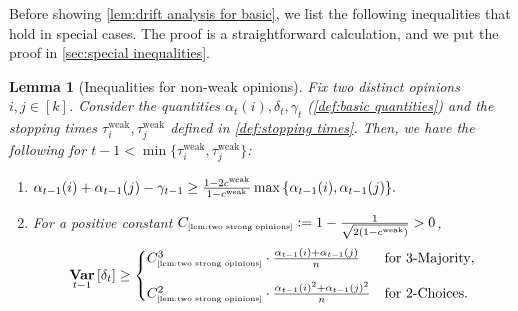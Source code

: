 \documentclass[letterpaper,11pt]{article}
\newtheorem{lemma}[theorem]{Lemma}
\def\defeq{\mathrel{\mathop:}=}
\DeclareMathOperator*{\E}{\mathbb{E}}
\DeclareMathOperator*{\Var}{\mathbf{Var}}
\newcommand{\constref}[1]{C_{\mbox{\tiny\ref{#1}}}}
\newcommand{\alphanorm}{\gamma}
\newcommand{\cweak}{c^{\mathrm{weak}}}
\newcommand{\tauiweak}{\tau^{\mathrm{weak}}_i}
\newcommand{\taujweak}{\tau^{\mathrm{weak}}_j}
\begin{document}
Before showing \cref{lem:drift analysis for basic}, we list the following inequalities that hold in special cases.
The proof is a straightforward calculation, and we put the proof in \cref{sec:special inequalities}.
\begin{lemma}[Inequalities for non-weak opinions]
    \label{lem:two strong opinions}
    Fix two distinct opinions $i,j\in [k]$.
    Consider the quantities $\alpha_t(i),\delta_t,\alphanorm_t$ (\cref{def:basic quantities}) and the
    stopping times $\tauiweak,\taujweak$ defined in \cref{def:stopping times}.
    Then, we have the following for $t-1<\min\{\tauiweak,\taujweak\}$:
    \begin{enumerate}
            \renewcommand{\labelenumi}{(\roman{enumi})}
        \item \label{item:lower bound for multipricative term} 
        $\alpha_{t-1}(i)+\alpha_{t-1}(j)-\alphanorm_{t-1}\geq \frac{1-2\cweak}{1-\cweak}\max\qty{\alpha_{t-1}(i),\alpha_{t-1}(j)}.$
        
        \item \label{item:lower bound for variance}
        For a positive constant $\constref{lem:two strong opinions}\defeq 1-\frac{1}{\sqrt{2(1-\cweak)}}>0$,
        \begin{align*} 
            \Var_{t-1}\qty[\delta_t]
            \geq \begin{cases}
                \constref{lem:two strong opinions}^3 \cdot \frac{\alpha_{t-1}(i)+\alpha_{t-1}(j)}{n}	& \text{for 3-Majority},\\[10pt]
               \constref{lem:two strong opinions}^2 \cdot \frac{\alpha_{t-1}(i)^2+\alpha_{t-1}(j)^2}{n}	& \text{for 2-Choices}.
            \end{cases}
       \end{align*}
    \end{enumerate}
\end{lemma}
\end{document}
